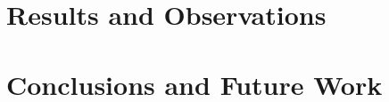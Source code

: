 \documentclass[12pt, a4paper]{report}
\newenvironment{code}
{\footnotesize\verbatim}{\endverbatim\normalfont}
\theoremstyle{definition}
\theoremstyle{definition}%
\theoremstyle{definition}%
\theoremstyle{definition}%
\theoremstyle{definition}%
\theoremstyle{definition}%
\begin{document}
\chapter{Results and Observations} \label{chap:results_observations}


\chapter{Conclusions and Future Work} \label{chap:conclusion}


\appendix




\bibliomatter




\end{document}
